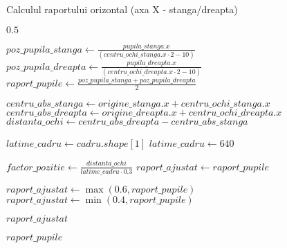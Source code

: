 \documentclass[12pt,a4paper]{article}
\begin{document}
\begin{algorithm}[H]
    \caption{Calculul raportului orizontal (axa X - stanga/dreapta)}
    \begin{algorithmic}[1]
            \State \Return $0.5$ 
        \EndIf
    
        \State $poz\_pupila\_stanga \gets \frac{pupila\_stanga.x}{(centru\_ochi\_stanga.x \cdot 2 - 10)}$ 
        \State $poz\_pupila\_dreapta \gets \frac{pupila\_dreapta.x}{(centru\_ochi\_dreapta.x \cdot 2 - 10)}$
        \State $raport\_pupile \gets \frac{poz\_pupila\_stanga + poz\_pupila\_dreapta}{2}$ 
    
            \State $centru\_abs\_stanga \gets origine\_stanga.x + centru\_ochi\_stanga.x$
            \State $centru\_abs\_dreapta \gets origine\_dreapta.x + centru\_ochi\_dreapta.x$
            \State $distanta\_ochi \gets centru\_abs\_dreapta - centru\_abs\_stanga$
    
                \State $latime\_cadru \gets cadru.shape[1]$ 
            \Else
                \State $latime\_cadru \gets 640$ 
            \EndIf
    
            \State $factor\_pozitie \gets \frac{distanta\_ochi}{latime\_cadru \cdot 0.3}$ 
            \State $raport\_ajustat \gets raport\_pupile$ 
    
                \State $raport\_ajustat \gets \max(0.6, raport\_pupile)$ 
                \State $raport\_ajustat \gets \min(0.4, raport\_pupile)$ 
            \EndIf
    
            \State \Return $raport\_ajustat$
        \EndIf
    
        \State \Return $raport\_pupile$ 
    \EndProcedure
    \end{algorithmic}
    \end{algorithm}
    
\end{document}
